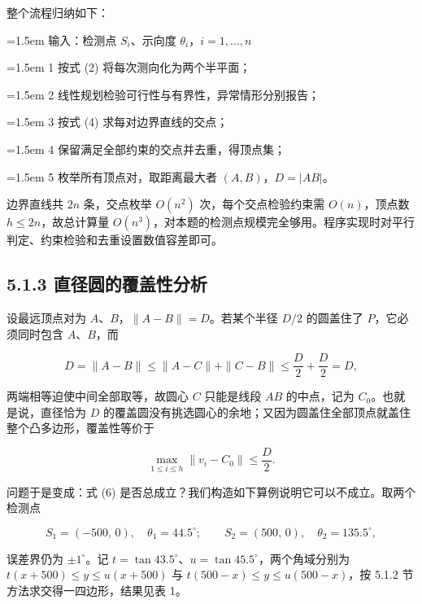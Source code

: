 \documentclass[UTF8,a4paper,zihao=-4,fontset=fandol]{ctexart}
\begin{document}
整个流程归纳如下：

\begin{tcolorbox}[colback=black!2,colframe=black!22,boxrule=0.4pt,arc=0pt,left=9pt,right=9pt,top=7pt,bottom=7pt]
\small\setlength{\parskip}{2pt}
\noindent\hangindent=1.5em 输入：检测点 $S_i$、示向度 $\theta_i$，$i=1,\dots,n$\par
\noindent\hangindent=1.5em 1  按式 (2) 将每次测向化为两个半平面；\par
\noindent\hangindent=1.5em 2  线性规划检验可行性与有界性，异常情形分别报告；\par
\noindent\hangindent=1.5em 3  按式 (4) 求每对边界直线的交点；\par
\noindent\hangindent=1.5em 4  保留满足全部约束的交点并去重，得顶点集；\par
\noindent\hangindent=1.5em 5  枚举所有顶点对，取距离最大者 $(A,B)$，$D=|AB|$。\par
\end{tcolorbox}

边界直线共 $2n$ 条，交点枚举 $O(n^2)$ 次，每个交点检验约束需 $O(n)$，顶点数 $h\le 2n$，故总计算量 $O(n^3)$，对本题的检测点规模完全够用。程序实现时对平行判定、约束检验和去重设置数值容差即可。

\subsection*{5.1.3 直径圆的覆盖性分析}

设最远顶点对为 $A$、$B$，$\|A-B\|=D$。若某个半径 $D/2$ 的圆盖住了 $P$，它必须同时包含 $A$、$B$，而

\[
D=\|A-B\|\le\|A-C\|+\|C-B\|\le\frac D2+\frac D2=D,
\]

两端相等迫使中间全部取等，故圆心 $C$ 只能是线段 $AB$ 的中点，记为 $C_0$。也就是说，直径恰为 $D$ 的覆盖圆没有挑选圆心的余地；又因为圆盖住全部顶点就盖住整个凸多边形，覆盖性等价于

\[
\max_{1\le i\le h}\|v_i-C_0\|\le\frac D2 . \tag{6}
\]

问题于是变成：式 (6) 是否总成立？我们构造如下算例说明它可以不成立。取两个检测点

\[
S_1=(-500,\,0),\quad\theta_1=44.5^\circ;\qquad
S_2=(500,\,0),\quad\theta_2=135.5^\circ,
\]

误差界仍为 $\pm 1^\circ$。记 $t=\tan 43.5^\circ$、$u=\tan 45.5^\circ$，两个角域分别为 $t(x+500)\le y\le u(x+500)$ 与 $t(500-x)\le y\le u(500-x)$，按 5.1.2 节方法求交得一四边形，结果见表 1。
\end{document}
